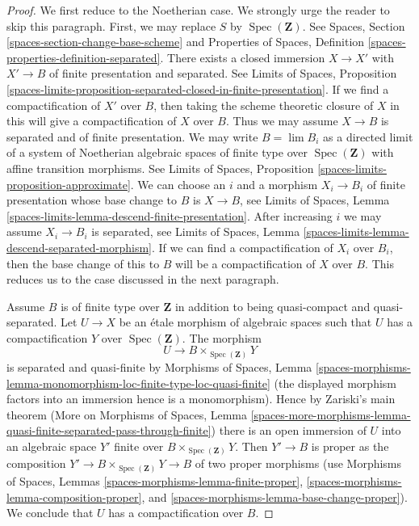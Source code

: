 \documentclass[10pt,a4paper]{amsart}
\theoremstyle{plain}
\theoremstyle{definition}
\theoremstyle{remark}
\numberwithin{equation}{subsection}
\def\lim{\mathop{\mathrm{lim}}\nolimits}
\def\Spec{\mathop{\mathrm{Spec}}}
\begin{document}
\begin{proof}
We first reduce to the Noetherian case. We strongly urge the reader
to skip this paragraph. First, we may replace $S$ by $\Spec(\mathbf{Z})$.
See Spaces, Section \ref{spaces-section-change-base-scheme} and
Properties of Spaces, Definition \ref{spaces-properties-definition-separated}.
There exists a closed immersion
$X \to X'$ with $X' \to B$ of finite presentation and separated.
See Limits of Spaces, Proposition
\ref{spaces-limits-proposition-separated-closed-in-finite-presentation}.
If we find a compactification of $X'$ over $B$, then
taking the scheme theoretic closure of $X$ in this will give
a compactification of $X$ over $B$. Thus we may assume
$X \to B$ is separated and of finite presentation.
We may write $B = \lim B_i$ as a directed
limit of a system of Noetherian algebraic spaces
of finite type over $\Spec(\mathbf{Z})$
with affine transition morphisms.
See Limits of Spaces, Proposition \ref{spaces-limits-proposition-approximate}.
We can choose an $i$ and a morphism $X_i \to B_i$ of finite
presentation whose base change to $B$ is $X \to B$, see
Limits of Spaces, Lemma \ref{spaces-limits-lemma-descend-finite-presentation}.
After increasing $i$ we may assume $X_i \to B_i$ is separated, see
Limits of Spaces, Lemma
\ref{spaces-limits-lemma-descend-separated-morphism}.
If we can find a compactification of $X_i$ over $B_i$, then the
base change of this to $B$ will be a compactification of $X$ over $B$.
This reduces us to the case discussed in the next paragraph.

\medskip\noindent
Assume $B$ is of finite type over $\mathbf{Z}$ in addition to being
quasi-compact and quasi-separated. Let $U \to X$ be an \'etale
morphism of algebraic spaces such that $U$ has a compactification
$Y$ over $\Spec(\mathbf{Z})$. The morphism
$$
U \longrightarrow B \times_{\Spec(\mathbf{Z})} Y
$$
is separated and quasi-finite by Morphisms of Spaces, Lemma
\ref{spaces-morphisms-lemma-monomorphism-loc-finite-type-loc-quasi-finite}
(the displayed morphism factors into an immersion hence is a monomorphism).
Hence by Zariski's main theorem (More on Morphisms of Spaces, Lemma
\ref{spaces-more-morphisms-lemma-quasi-finite-separated-pass-through-finite})
there is an open immersion of $U$ into an algebraic space $Y'$
finite over $B \times_{\Spec(\mathbf{Z})} Y$. Then $Y' \to B$ is proper
as the composition $Y' \to B \times_{\Spec(\mathbf{Z})} Y \to B$
of two proper morphisms
(use Morphisms of Spaces, Lemmas \ref{spaces-morphisms-lemma-finite-proper},
\ref{spaces-morphisms-lemma-composition-proper}, and
\ref{spaces-morphisms-lemma-base-change-proper}).
We conclude that $U$ has a compactification over $B$.


\end{proof}
\end{document}
